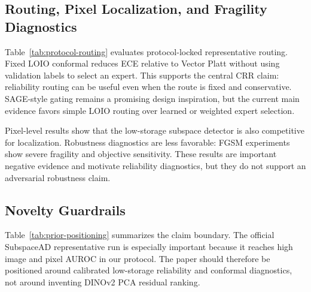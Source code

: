\subsection{Routing, Pixel Localization, and Fragility Diagnostics}

Table~\ref{tab:protocol-routing} evaluates protocol-locked representative routing. Fixed LOIO conformal reduces ECE relative to Vector Platt without using validation labels to select an expert. This supports the central CRR claim: reliability routing can be useful even when the route is fixed and conservative. SAGE-style gating remains a promising design inspiration, but the current main evidence favors simple LOIO routing over learned or weighted expert selection.


Pixel-level results show that the low-storage subspace detector is also competitive for localization. Robustness diagnostics are less favorable: FGSM experiments show severe fragility and objective sensitivity. These results are important negative evidence and motivate reliability diagnostics, but they do not support an adversarial robustness claim.

\subsection{Novelty Guardrails}

Table~\ref{tab:prior-positioning} summarizes the claim boundary. The official SubspaceAD representative run is especially important because it reaches high image and pixel AUROC in our protocol. The paper should therefore be positioned around calibrated low-storage reliability and conformal diagnostics, not around inventing DINOv2 PCA residual ranking.
